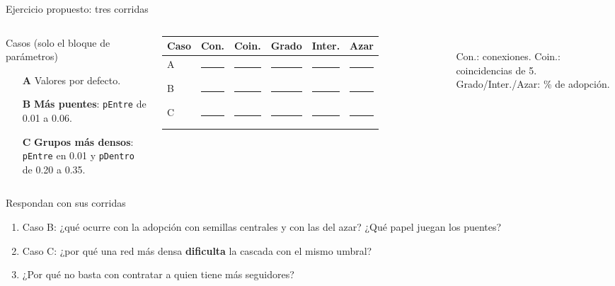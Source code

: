 \documentclass[aspectratio=169,xcolor=dvipsnames]{beamer}
\begin{document}
\begin{frame}{Ejercicio propuesto: tres corridas}
\begin{columns}[T]
  \begin{exampleblock}{Casos (solo el bloque de parámetros)}
    \scriptsize
    \begin{itemize}
      \item[\textbf{A}] Valores por defecto.
      \item[\textbf{B}] \textbf{Más puentes}: \texttt{pEntre} de 0.01 a 0.06.
      \item[\textbf{C}] \textbf{Grupos más densos}: \texttt{pEntre} en 0.01 y \texttt{pDentro} de 0.20 a 0.35.
    \end{itemize}
  \end{exampleblock}
  \scriptsize
  \begin{tabular}{@{}lccccc@{}}
    \toprule
    Caso & Con. & Coin. & Grado & Inter. & Azar \\
    \midrule
    A & \rule{0.45cm}{0.4pt} & \rule{0.45cm}{0.4pt} & \rule{0.45cm}{0.4pt} & \rule{0.45cm}{0.4pt} & \rule{0.45cm}{0.4pt} \\[2pt]
    B & \rule{0.45cm}{0.4pt} & \rule{0.45cm}{0.4pt} & \rule{0.45cm}{0.4pt} & \rule{0.45cm}{0.4pt} & \rule{0.45cm}{0.4pt} \\[2pt]
    C & \rule{0.45cm}{0.4pt} & \rule{0.45cm}{0.4pt} & \rule{0.45cm}{0.4pt} & \rule{0.45cm}{0.4pt} & \rule{0.45cm}{0.4pt} \\
    \bottomrule
  \end{tabular}\\[2pt]
  {\tiny Con.: conexiones. Coin.: coincidencias de 5. Grado/Inter./Azar: \% de adopción.}
\end{columns}
\vspace{2pt}
\begin{block}{Respondan con sus corridas}
  \scriptsize
  \begin{enumerate}
    \item Caso B: ¿qué ocurre con la adopción con semillas centrales y con las del azar? ¿Qué papel juegan los puentes?
    \item Caso C: ¿por qué una red más densa \textbf{dificulta} la cascada con el mismo umbral?
    \item ¿Por qué no basta con contratar a quien tiene más seguidores?
  \end{enumerate}
\end{block}
\end{frame}
\end{document}
